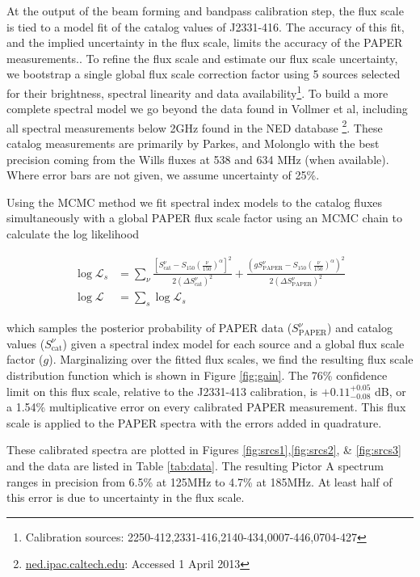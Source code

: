 \documentclass[preprint]{aastex}
\newcommand{\PAPER}{\mathrm{PAPER}}
\begin{document}
At the output of the beam forming and bandpass calibration step, the flux scale
 is tied to a model fit of the catalog values of
J2331-416. The accuracy of this fit, and the implied uncertainty in the flux
scale, limits the accuracy of the PAPER measurements..  To refine the flux
scale and estimate our flux scale uncertainty, we bootstrap a single global flux scale 
correction factor using 5
sources selected for their brightness, spectral linearity and data
availability\footnote{Calibration sources:
2250-412,2331-416,2140-434,0007-446,0704-427}. To build a more complete
spectral model we go beyond the data found in Vollmer et al, including all spectral
measurements below 2GHz found in the NED database \footnote{\url{ned.ipac.caltech.edu}: Accessed 1 April 2013}.  These catalog measurements
are primarily by Parkes, and Molonglo with the best precision coming from the
Wills fluxes at 538 and 634 MHz (when available). Where error bars are not
given, we assume uncertainty of 25\%. 

Using the MCMC method we fit spectral index models to the catalog fluxes
 simultaneously with a global PAPER flux scale factor using  an MCMC chain to calculate the log likelihood

\begin{align}
\log\mathcal{L}_s &= \sum_{\nu}\frac{ \left[S_\textrm{cat}^{\nu}  - S_{150}  \left(\frac{\nu}{150}\right)^\alpha\right]^2}{2(\Delta S_\textrm{cat}^\nu)^2} +
\frac{ (g S_\PAPER^{\nu}  - S_{150}\left(\frac{\nu}{150}\right)^\alpha)^2}{2(\Delta S_\PAPER^\nu)^2} \nonumber \\
\log\mathcal{L} &= \sum_{s} \log\mathcal{L}_s
\end{align}


which samples the posterior probability of PAPER data ($S_\PAPER^{\nu}$) and
catalog values ($S_\textrm{cat}^{\nu}$) given a spectral index model for each source and
a global flux scale factor ($g$).
Marginalizing over the fitted flux scales, we find the resulting flux scale distribution function which is shown in Figure
\ref{fig:gain}. The 76\% confidence limit on this flux scale, relative to the
J2331-413 calibration, is  $+0.11 ^{+0.05}_{-0.08}$ dB, or a 1.54\%
multiplicative error on every calibrated PAPER measurement.  This flux scale is applied to the PAPER spectra
with the errors added in quadrature.

These calibrated spectra are plotted in Figures \ref{fig:srcs1},\ref{fig:srcs2},
\& \ref{fig:srcs3} and the data are listed in Table \ref{tab:data}.  The
resulting Pictor A spectrum ranges in precision from 6.5\% at 125MHz to 4.7\%
at 185MHz. At least half of this error is due to uncertainty in the flux scale.  
\end{document}
